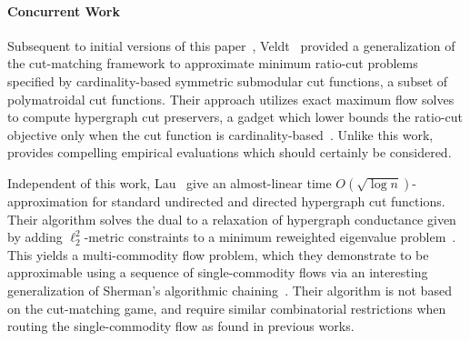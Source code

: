 \documentclass[letterpaper]{article}
\begin{document}
\paragraph{Concurrent Work}
Subsequent to initial versions of this paper~\cite{ameranisEfficientFlowbasedApproximation2023}, Veldt~\cite{veldt2023cut} provided a generalization of the cut-matching framework to approximate minimum ratio-cut problems specified by cardinality-based symmetric submodular cut functions, a subset of polymatroidal cut functions. Their approach utilizes exact maximum flow solves to compute hypergraph cut preservers, a gadget which lower bounds the ratio-cut objective only when the cut function is cardinality-based~\cite{veldtHypergraphCutsGeneral2020, veldt2021approximate}. Unlike this work,~\cite{veldt2023cut} provides compelling empirical evaluations which should certainly be considered.

Independent of this work, Lau~\etal\cite{lau2023fast} give an almost-linear time $O(\sqrt{\log n})$-approximation for standard undirected and directed hypergraph cut functions. Their algorithm solves the dual to a relaxation of hypergraph conductance given by adding $\ell_2^2$-metric constraints to a minimum reweighted eigenvalue problem~\cite{lau2022cheeger}. This yields a multi-commodity flow problem, which they demonstrate to be approximable using a sequence of single-commodity flows via an interesting generalization of Sherman's algorithmic chaining~\cite{shermanBreakingMulticommodityFlow2009}. Their algorithm is not based on the cut-matching game, and require similar combinatorial restrictions when routing the single-commodity flow as found in previous works.
\end{document}
